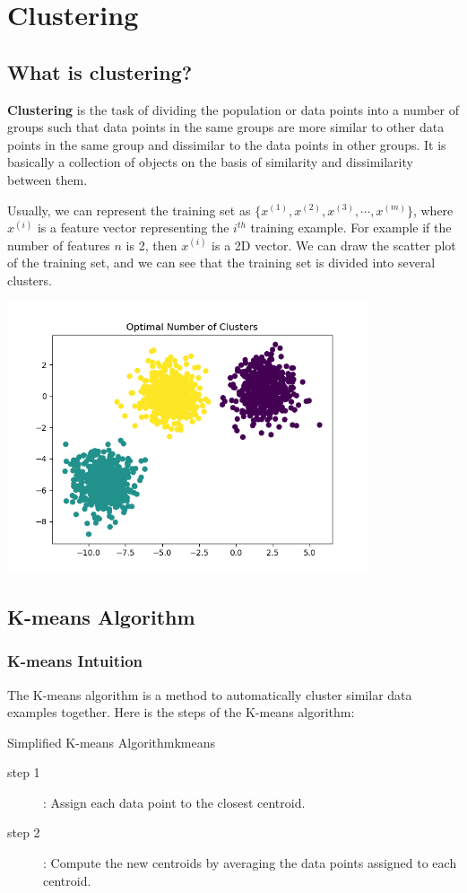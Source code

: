 \chapter{Clustering}
\section{What is clustering?}
\textbf{Clustering} is the task of dividing the population or data points into a number of groups 
such that data points in the same groups are more similar to other data 
points in the same group and dissimilar to the data points in other groups. 
It is basically a collection of objects 
on the basis of similarity and dissimilarity between them.\par

Usually, we can represent the training set as $\{x^{(1)}, x^{(2)}, x^{(3)}, \cdots, x^{(m)}\}$,
where $x^{(i)}$ is a feature vector representing the $i^{th}$ training example.
For example if the number of features $n$ is 2, then $x^{(i)}$ is a 2D vector.
We can draw the scatter plot of the training set, 
and we can see that the training set is divided into several clusters.

\begin{center}
\includegraphics*[width=0.8\textwidth]{images/km1}
\end{center}

\section{K-means Algorithm}
\subsection*{K-means Intuition}
The K-means algorithm is a method to automatically cluster similar data examples together.
Here is the steps of the K-means algorithm:
\begin{thmbox}{Simplified K-means Algorithm}{kmeans}
    \begin{description}
        \item[step 1]: Assign each data point to the closest centroid.
        \item[step 2]: Compute the new centroids by averaging the data points assigned to each centroid.
    \end{description}
\end{thmbox}


